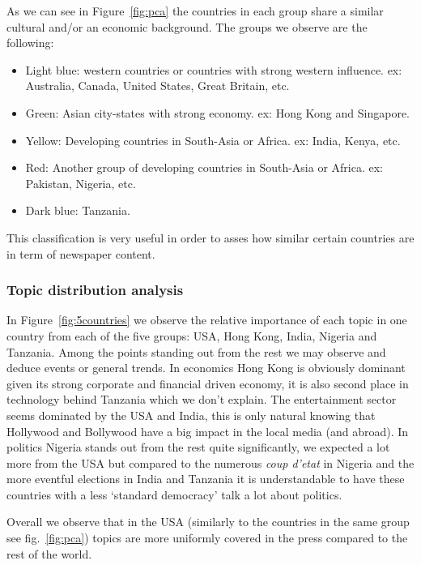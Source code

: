 \documentclass[11pt]{article}
\begin{document}
As we can see in Figure~\ref{fig:pca} the countries in each group share a similar cultural and/or an economic background. The groups we observe are the following:
\begin{itemize}
    \item Light blue: western countries or countries with strong western influence. ex: Australia, Canada, United States, Great Britain, etc.
    \item Green: Asian city-states with strong economy. ex: Hong Kong and Singapore.
    \item Yellow: Developing countries in South-Asia or Africa. ex: India, Kenya, etc.
    \item Red: Another group of developing countries in South-Asia or Africa. ex: Pakistan, Nigeria, etc.
    \item Dark blue: Tanzania.
\end{itemize}

This classification is very useful in order to asses how similar certain countries are in term of newspaper content.



\subsubsection{Topic distribution analysis}
In Figure~\ref{fig:5countries} we observe the relative importance of each topic in one country from each of the five groups: USA, Hong Kong, India, Nigeria and Tanzania.
Among the points standing out from the rest we may observe and deduce events or general trends. In economics Hong Kong is obviously dominant given its strong corporate and financial driven economy, it is also second place in technology behind Tanzania which we don't explain.
The entertainment sector seems dominated by the USA and India, this is only natural knowing that Hollywood and Bollywood have a big impact in the local media (and abroad).
In politics Nigeria stands out from the rest quite significantly, we expected a lot more from the USA but compared to the numerous \textit{coup d'etat} in Nigeria \autocite{bbc:18} and the more eventful elections in India and Tanzania it is understandable to have these countries with a less `standard democracy' talk a lot about politics.

Overall we observe that in the USA (similarly to the countries in the same group see fig.~\ref{fig:pca}) topics are more uniformly covered in the press compared to the rest of the world.
\end{document}
